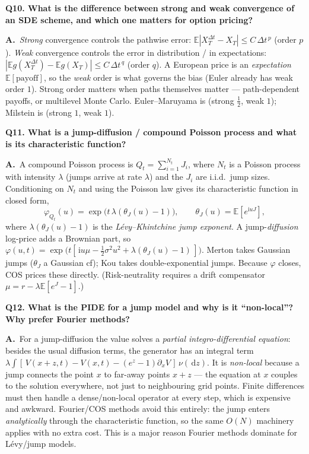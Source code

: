 \documentclass[11pt]{article}
\newcommand{\E}{\mathbb{E}}
\newcommand{\ii}{\mathrm{i}}
\newcommand{\dd}{\,\mathrm{d}}
\newcommand{\ch}{\varphi}
\newcommand{\Qq}[1]{\bigskip\noindent\textbf{\large #1}\par\nobreak\smallskip}
\newcommand{\A}{\noindent\textbf{A.}\ }
\begin{document}
\Qq{Q10. What is the difference between strong and weak convergence of an SDE scheme, and which one matters for option pricing?}
\A \emph{Strong} convergence controls the pathwise error: $\E|X_T^{\Delta t}-X_T|\le C\,\Delta t^{\,p}$ (order
$p$). \emph{Weak} convergence controls the error in distribution / in expectations:
$|\E g(X_T^{\Delta t})-\E g(X_T)|\le C\,\Delta t^{\,q}$ (order $q$). A European price is an \emph{expectation}
$\E[\text{payoff}]$, so the \emph{weak} order is what governs the bias (Euler already has weak order $1$). Strong
order matters when paths themselves matter --- path-dependent payoffs, or multilevel Monte Carlo. Euler--Maruyama
is (strong $\tfrac12$, weak $1$); Milstein is (strong $1$, weak $1$).

\Qq{Q11. What is a jump-diffusion / compound Poisson process and what is its characteristic function?}
\A A compound Poisson process is $Q_t=\sum_{i=1}^{N_t}J_i$, where $N_t$ is a Poisson process with intensity
$\lambda$ (jumps arrive at rate $\lambda$) and the $J_i$ are i.i.d.\ jump sizes. Conditioning on $N_t$ and using
the Poisson law gives its characteristic function in closed form,
\[
\ch_{Q_t}(u)=\exp\!\big(t\,\lambda(\theta_J(u)-1)\big),\qquad \theta_J(u)=\E[e^{\ii uJ}],
\]
where $\lambda(\theta_J(u)-1)$ is the \emph{L\'evy--Khintchine jump exponent}. A jump-\emph{diffusion} log-price
adds a Brownian part, so $\ch(u,t)=\exp\!\big(t[\,\ii u\mu-\tfrac12\sigma^2u^2+\lambda(\theta_J(u)-1)\,]\big)$.
Merton takes Gaussian jumps ($\theta_J$ a Gaussian cf); Kou takes double-exponential jumps. Because $\ch$
closes, COS prices these directly. (Risk-neutrality requires a drift compensator $\mu=r-\lambda\E[e^J-1]$.)

\Qq{Q12. What is the PIDE for a jump model and why is it ``non-local''? Why prefer Fourier methods?}
\A For a jump-diffusion the value solves a \emph{partial integro-differential equation}: besides the usual
diffusion terms, the generator has an integral term
$\lambda\!\int\![\,V(x+z,t)-V(x,t)-(e^z-1)\partial_x V\,]\,\nu(\dd z)$. It is \emph{non-local} because a jump
connects the point $x$ to far-away points $x+z$ --- the equation at $x$ couples to the solution everywhere, not
just to neighbouring grid points. Finite differences must then handle a dense/non-local operator at every step,
which is expensive and awkward. Fourier/COS methods avoid this entirely: the jump enters \emph{analytically}
through the characteristic function, so the same $O(N)$ machinery applies with no extra cost. This is a major
reason Fourier methods dominate for L\'evy/jump models.
\end{document}
